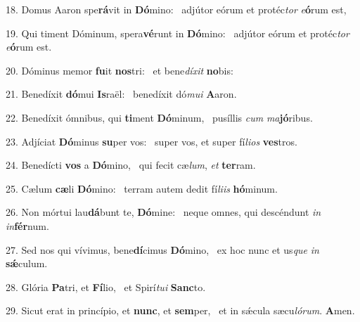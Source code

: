18. Domus Aaron spe\textbf{rá}vit in \textbf{Dó}mino: \ast\  adjútor eórum et protéc\textit{tor} \textit{e}\textbf{ó}rum est,\

19. Qui timent Dóminum, spera\textbf{vé}runt in \textbf{Dó}mino: \ast\  adjútor eórum et protéc\textit{tor} \textit{e}\textbf{ó}rum est.\

20. Dóminus memor \textbf{fu}it \textbf{nos}tri: \ast\  et bene\textit{dí}\textit{xit} \textbf{no}bis:\

21. Benedíxit \textbf{dó}mui \textbf{Is}raël: \ast\  benedíxit dó\textit{mu}\textit{i} \textbf{A}aron.\

22. Benedíxit ómnibus, qui \textbf{ti}ment \textbf{Dó}minum, \ast\  pusíllis \textit{cum} \textit{ma}\textbf{jó}ribus.\

23. Adjíciat \textbf{Dó}minus \textbf{su}per vos: \ast\  super vos, et super fí\textit{li}\textit{os} \textbf{ves}tros.\

24. Benedícti \textbf{vos} a \textbf{Dó}mino, \ast\  qui fecit cæ\textit{lum}, \textit{et} \textbf{ter}ram.\

25. Cælum \textbf{cæ}li \textbf{Dó}mino: \ast\  terram autem dedit fí\textit{li}\textit{is} \textbf{hó}minum.\

26. Non mórtui lau\textbf{dá}bunt te, \textbf{Dó}mine: \ast\  neque omnes, qui descéndunt \textit{in} \textit{in}\textbf{fér}num.\

27. Sed nos qui vívimus, bene\textbf{dí}cimus \textbf{Dó}mino, \ast\  ex hoc nunc et us\textit{que} \textit{in} \textbf{sǽ}culum.\

28. Glória \textbf{Pa}tri, et \textbf{Fí}lio, \ast\  et Spirí\textit{tu}\textit{i} \textbf{Sanc}to.\

29. Sicut erat in princípio, et \textbf{nunc}, et \textbf{sem}per, \ast\  et in sǽcula sæcu\textit{ló}\textit{rum}. \textbf{A}men.\

